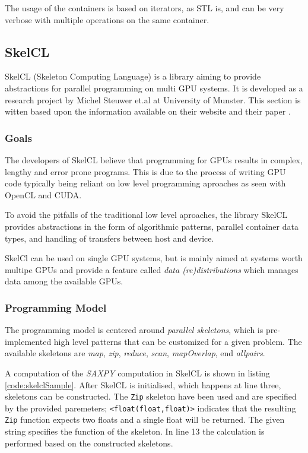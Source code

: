 The usage of the containers is based on iterators, as STL is, and can be very verbose with multiple operations on the same container.


\subsection{SkelCL}
SkelCL (Skeleton Computing Language) is a library aiming to provide abstractions for parallel programming on multi GPU systems. It is developed as a research project by Michel Steuwer et.al at University of Munster. This section is witten based upon the information available on their website \cite{skelclWebsite} and their paper \cite{skelclPaper}.

\subsubsection{Goals}
The developers of SkelCL believe that programming for GPUs results in complex, lengthy and error prone programs. This is due to the process of writing GPU code typically being reliant on low level programming aproaches as seen with OpenCL and CUDA. 

To avoid the pitfalls of the traditional low level aproaches, the library SkelCL provides abstractions in the form of algorithmic patterns, parallel container data types, and handling of transfers between host and device. 

SkelCl can be used on single GPU systems, but is mainly aimed at systems worth multipe GPUs and provide a feature called \textit{data (re)distributions} which manages data among the available GPUs.

\subsubsection{Programming Model}
The programming model is centered around \textit{parallel skeletons}, which is pre-implemented high level patterns that can be customized for a given problem. The available skeletons are \textit{map}, \textit{zip}, \textit{reduce}, \textit{scan}, \textit{mapOverlap}, end \textit{allpairs}.

A computation of the \textit{SAXPY} computation in SkelCL is shown in listing \ref{code:skelclSample}. After SkelCL is initialised, which happens at line three, skeletons can be constructed. The \texttt{Zip} skeleton have been used and are specified by the provided paremeters; \texttt{<float(float,float)>} indicates that the resulting \texttt{Zip} function expects two floats and a single float will be returned. The given string specifies the function of the skeleton. In line 13 the calculation is performed based on the constructed skeletons.


